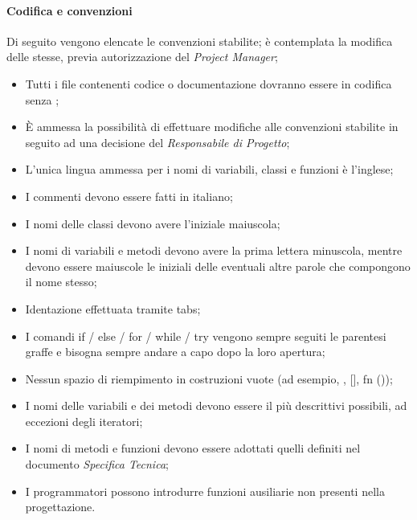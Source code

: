    \paragraph{Codifica e convenzioni}
   Di seguito vengono elencate le convenzioni stabilite; è contemplata la modifica delle stesse, previa autorizzazione del \emph{Project Manager};
\begin{itemize}
\item Tutti i file contenenti codice o documentazione dovranno essere in codifica  senza ;
\item È ammessa la possibilità di effettuare modifiche alle convenzioni stabilite in seguito ad una decisione del \emph{Responsabile di Progetto};
\item L'unica lingua ammessa per i nomi di variabili, classi e funzioni è l'inglese;
\item I commenti devono essere fatti in italiano;
\item I nomi delle classi devono avere l’iniziale maiuscola;
\item I nomi di variabili e metodi devono avere la prima lettera minuscola, mentre devono essere maiuscole le iniziali delle eventuali altre parole che compongono il nome stesso;
\item Identazione effettuata tramite tabs;
\item I comandi if / else / for / while / try vengono sempre seguiti le parentesi graffe e bisogna sempre andare a capo dopo la loro apertura;
\item Nessun spazio di riempimento in costruzioni vuote (ad esempio, {}, [], fn ());
\item I nomi delle variabili e dei metodi devono essere il più descrittivi possibili, ad eccezioni degli iteratori;
\item I nomi di metodi e funzioni devono essere adottati quelli definiti nel documento \emph{Specifica Tecnica};
\item I programmatori possono introdurre funzioni ausiliarie non presenti nella progettazione.
\end{itemize}


